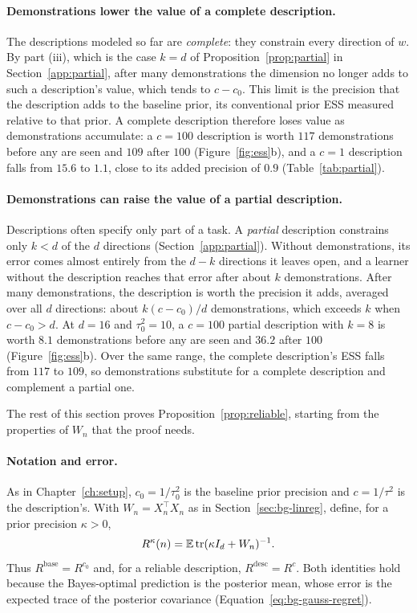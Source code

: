 \paragraph{Demonstrations lower the value of a complete description.}
The descriptions modeled so far are \emph{complete}: they constrain every direction of $w$. By part (iii), which is the case $k=d$ of Proposition~\ref{prop:partial} in Section~\ref{app:partial}, after many demonstrations the dimension no longer adds to such a description's value, which tends to $c-c_0$. This limit is the precision that the description adds to the baseline prior, its conventional prior ESS \citep{morita2008} measured relative to that prior. A complete description therefore loses value as demonstrations accumulate: a $c=100$ description is worth $117$ demonstrations before any are seen and $109$ after $100$ (Figure~\ref{fig:ess}b), and a $c=1$ description falls from $15.6$ to $1.1$, close to its added precision of $0.9$ (Table~\ref{tab:partial}).

\paragraph{Demonstrations can raise the value of a partial description.}
Descriptions often specify only part of a task. A \emph{partial} description constrains only $k<d$ of the $d$ directions (Section~\ref{app:partial}). Without demonstrations, its error comes almost entirely from the $d-k$ directions it leaves open, and a learner without the description reaches that error after about $k$ demonstrations. After many demonstrations, the description is worth the precision it adds, averaged over all $d$ directions: about $k(c-c_0)/d$ demonstrations, which exceeds $k$ when $c-c_0>d$. At $d=16$ and $\tau_0^2=10$, a $c=100$ partial description with $k=8$ is worth $8.1$ demonstrations before any are seen and $36.2$ after $100$ (Figure~\ref{fig:ess}b). Over the same range, the complete description's ESS falls from $117$ to $109$, so demonstrations substitute for a complete description and complement a partial one.

The rest of this section proves Proposition~\ref{prop:reliable}, starting from the properties of $W_n$ that the proof needs.

\paragraph{Notation and error.}
As in Chapter~\ref{ch:setup}, $c_0=1/\tau_0^2$ is the baseline prior precision and $c=1/\tau^2$ is the description's. With $W_n=X_n^\top X_n$ as in Section~\ref{sec:bg-linreg}, define, for a prior precision $\kappa>0$,
\[
R^{\kappa}(n)=\mathbb{E}\operatorname{tr}(\kappa I_d+W_n)^{-1}.
\]
Thus $R^{\mathrm{base}}=R^{c_0}$ and, for a reliable description, $R^{\mathrm{desc}}=R^c$. Both identities hold because the Bayes-optimal prediction is the posterior mean, whose error is the expected trace of the posterior covariance (Equation~\eqref{eq:bg-gauss-regret}).

